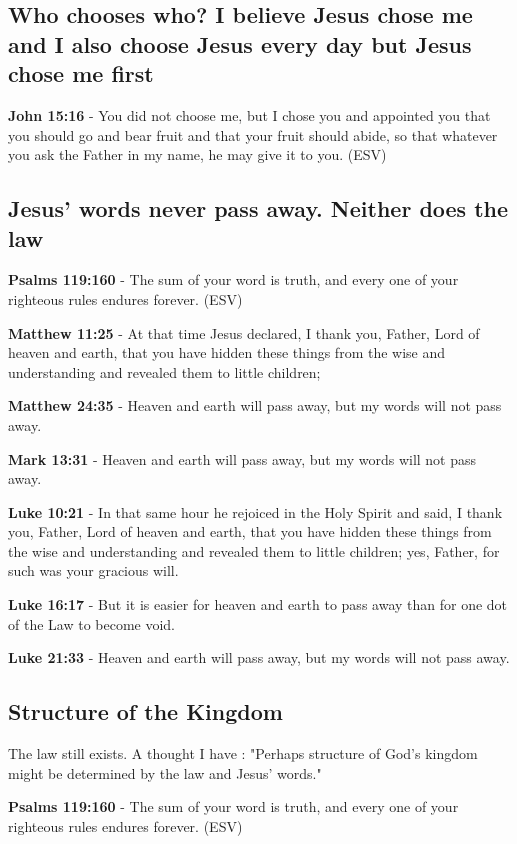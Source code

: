 \documentclass[11pt]{article}
\begin{document}
\subsection{Who chooses who? I believe Jesus chose me and I also choose Jesus every day but Jesus chose me first}
\label{sec:org761ff55}
\textbf{John 15:16} - You did not choose me, but I chose you and appointed you that you should go and bear fruit and that your fruit should abide, so that whatever you ask the Father in my name, he may give it to you. (ESV)

\subsection{Jesus' words never pass away. Neither does the law}
\label{sec:orgb5a7005}
\textbf{Psalms 119:160} - The sum of your word is truth, and every one of your righteous rules endures forever. (ESV)

\textbf{Matthew 11:25} - At that time Jesus declared, I thank you, Father, Lord of heaven and earth, that you have hidden these things from the wise and understanding and revealed them to little children;

\textbf{Matthew 24:35} - Heaven and earth will pass away, but my words will not pass away.

\textbf{Mark 13:31} - Heaven and earth will pass away, but my words will not pass away.

\textbf{Luke 10:21} - In that same hour he rejoiced in the Holy Spirit and said, I thank you, Father, Lord of heaven and earth, that you have hidden these things from the wise and understanding and revealed them to little children; yes, Father, for such was your gracious will.

\textbf{Luke 16:17} - But it is easier for heaven and earth to pass away than for one dot of the Law to become void.

\textbf{Luke 21:33} - Heaven and earth will pass away, but my words will not pass away.

\subsection{Structure of the Kingdom}
\label{sec:org793edbc}

The law still exists. A thought I have : "Perhaps structure of God's kingdom might be determined by the law and Jesus' words."

\textbf{Psalms 119:160} - The sum of your word is truth, and every one of your righteous rules endures forever. (ESV)
\end{document}
